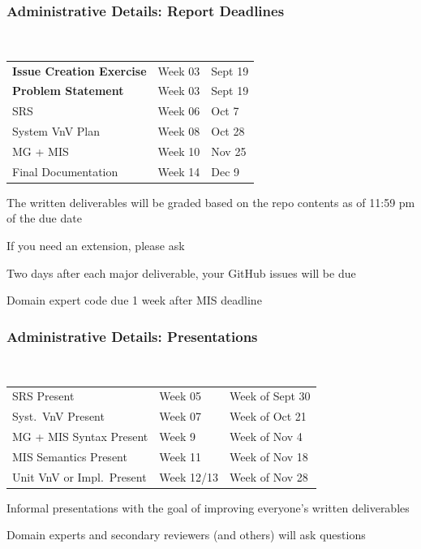 \documentclass[t,12pt,numbers,fleqn]{beamer}
\begin{document}

\begin{frame}
\frametitle{Administrative Details: Report Deadlines}
~\newline
\begin{tabular}{l l l}
\textbf{Issue Creation Exercise} & Week 03 & Sept 19\\
\textbf{Problem Statement} & Week 03 & Sept 19\\
SRS & Week 06 & Oct 7\\
System VnV Plan & Week 08 & Oct 28\\
MG + MIS & Week 10 & Nov 25\\
Final Documentation & Week 14 & Dec 9\\
\end {tabular}

\bi
\item The written deliverables will be graded based on the repo contents as of
11:59 pm of the due date
\item If you need an extension, please ask
\item Two days after each major deliverable, your GitHub issues will be due
\item Domain expert code due 1 week after MIS deadline
\ei

\end{frame}


\begin{frame}
\frametitle{Administrative Details: Presentations}

~\newline
\begin{tabular}{l l l}
SRS Present & Week 05 & Week of Sept 30\\
Syst.\ VnV Present & Week 07 & Week of Oct 21\\
MG + MIS Syntax Present & Week 9 & Week of Nov 4\\
MIS Semantics Present & Week 11 & Week of Nov 18\\
Unit VnV or Impl.\ Present & Week 12/13 & Week of Nov 28\\
\end {tabular}

\bi
\item Informal presentations with the goal of improving everyone's written
  deliverables
\item Domain experts and secondary reviewers (and others) will ask questions
\ei

\end{frame}
\end{document}
